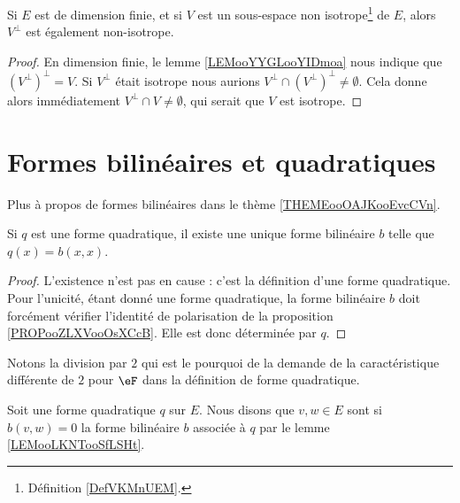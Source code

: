 \begin{lemma}	\label{LEMooOTVGooRAOyaD}
	Si \( E\) est de dimension finie, et si \( V\) est un sous-espace non isotrope\footnote{Définition \ref{DefVKMnUEM}.} de \( E\), alors \( V^{\perp}\) est également non-isotrope.
\end{lemma}

\begin{proof}
	En dimension finie, le lemme \ref{LEMooYYGLooYIDmoa} nous indique que \( (V^{\perp})^{\perp}=V\). Si \( V^{\perp}\) était isotrope nous aurions \( V^{\perp}\cap (V^{\perp})^{\perp}\neq \emptyset\). Cela donne alors immédiatement \( V^{\perp}\cap V\neq \emptyset\), qui serait que \( V\) est isotrope.
\end{proof}

\section{Formes bilinéaires et quadratiques}

Plus à propos de formes bilinéaires dans le thème \ref{THEMEooOAJKooEvcCVn}.


\begin{lemma}       \label{LEMooLKNTooSfLSHt}
	Si \( q\) est une forme quadratique, il existe une unique forme bilinéaire \( b\) telle que \( q(x)=b(x,x)\).
\end{lemma}

\begin{proof}
	L'existence n'est pas en cause : c'est la définition d'une forme quadratique. Pour l'unicité, étant donné une forme quadratique, la forme bilinéaire \( b\) doit forcément vérifier l'identité de polarisation de la proposition \ref{PROPooZLXVooOsXCcB}. Elle est donc déterminée par \( q\).
\end{proof}
Notons la division par \( 2\) qui est le pourquoi de la demande de la caractéristique différente de \( 2\) pour \( \eF\) dans la définition de forme quadratique.

\begin{definition}      \label{DEFooGECOooCCGVXG}
	Soit une forme quadratique \( q\) sur \( E\). Nous disons que \( v,w\in E\) sont  si \( b(v,w)=0\) la forme bilinéaire \( b\) associée à \( q\) par le lemme \ref{LEMooLKNTooSfLSHt}.
\end{definition}


